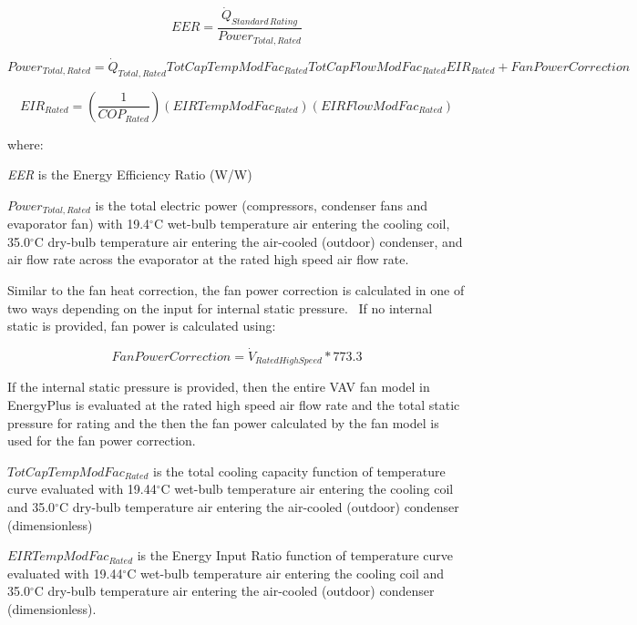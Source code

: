 \begin{equation}
  EER = \frac{{\dot Q}_{Standard\,Rating}}{Power_{Total,Rated}}
\end{equation}

\begin{equation}
    Power_{Total,Rated} = \dot{Q}_{Total,Rated} TotCapTempModFac_{Rated} TotCapFlowModFac_{Rated} EIR_{Rated} + FanPowerCorrection
\end{equation}

\begin{equation}
  EIR_{Rated} = \left( {\frac{1}{{CO{P_{Rated}}}}} \right)(EIRTempModFa{c_{Rated}})(EIRFlowModFa{c_{Rated}})
\end{equation}

where:

\emph{EER} is the Energy Efficiency Ratio (W/W)

\(Power_{Total,Rated}\) is the total electric power (compressors, condenser fans and evaporator fan) with 19.4\(^{\circ}\)C wet-bulb temperature air entering the cooling coil, 35.0\(^{\circ}\)C dry-bulb temperature air entering the air-cooled (outdoor) condenser, and air flow rate across the evaporator at the rated high speed air flow rate.

Similar to the fan heat correction, the fan power correction is calculated in one of two ways depending on the input for internal static pressure.~ If no internal static is provided, fan power is calculated using:

\begin{equation}
  FanPowerCorrection = {\dot V_{RatedHighSpeed}} * 773.3
\end{equation}

If the internal static pressure is provided, then the entire VAV fan model in EnergyPlus is evaluated at the rated high speed air flow rate and the total static pressure for rating and the then the fan power calculated by the fan model is used for the fan power correction.

\(TotCapTempModFac_{Rated}\) is the total cooling capacity function of temperature curve evaluated with 19.44\(^{\circ}\)C wet-bulb temperature air entering the cooling coil and 35.0\(^{\circ}\)C dry-bulb temperature air entering the air-cooled (outdoor) condenser (dimensionless)

\(EIRTempModFa{c_{Rated}}\) is the Energy Input Ratio function of temperature curve evaluated with 19.44\(^{\circ}\)C wet-bulb temperature air entering the cooling coil and 35.0\(^{\circ}\)C dry-bulb temperature air entering the air-cooled (outdoor) condenser (dimensionless).


